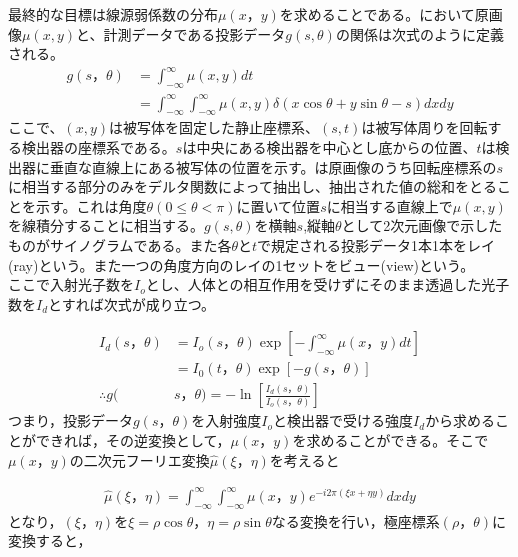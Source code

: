 最終的な目標は線源弱係数の分布$\mu(x，y)$を求めることである。において原画像$\mu(x,y)$と、計測データである投影データ$g(s,\theta)$の関係は次式のように定義される。
\begin{align}
g(s，\theta)&=\int^{\infty}_{-\infty}\mu(x,y)dt\\
&=\int^{\infty}_{-\infty}\int^{\infty}_{-\infty}\mu(x,y)\delta(x\cos{\theta}+y\sin{\theta}-s)dxdy\label{eq:radon}
\end{align}
ここで、$(x,y)$は被写体を固定した静止座標系、$(s,t)$は被写体周りを回転する検出器の座標系である。$s$は中央にある検出器を中心とし底からの位置、$t$は検出器に垂直な直線上にある被写体の位置を示す。は原画像のうち回転座標系の$s$に相当する部分のみをデルタ関数によって抽出し、抽出された値の総和をとることを示す。これは角度$\theta(0\leq\theta<\pi)$に置いて位置$s$に相当する直線上で$\mu(x,y)$を線積分することに相当する。$g(s,\theta)$を横軸$s$,縦軸$\theta$として2次元画像で示したものがサイノグラムである。また各$\theta$と$t$で規定される投影データ1本1本をレイ(ray)という。また一つの角度方向のレイの1セットをビュー(view)という。\\
ここで入射光子数を$I_o$とし、人体との相互作用を受けずにそのまま透過した光子数を$I_d$とすれば次式が成り立つ。

\begin{align}
I_d(s，\theta)&=I_o(s，\theta)\exp{\left[-\int^{\infty}_{-\infty}\mu(x，y)dt\right]}\\
&=I_0(t，\theta)\exp[-g(s，\theta)]\\
∴g(&s，\theta)=-\ln\left[\frac{I_d(s，\theta)}{I_o(s，\theta)}\right]\label{eq:touei}
\end{align}
つまり，投影データ$g(s，\theta)$を入射強度$I_o$と検出器で受ける強度$I_d$から求めることができれば，その逆変換として，$\mu(x，y)$を求めることができる。そこで$\mu(x，y)$の二次元フーリエ変換$\hat{\mu}(\xi，\eta)$を考えると

\begin{align}
\hat{\mu}(\xi，\eta)=\displaystyle\int^{\infty}_{-\infty}\int^{\infty}_{-\infty}\mu(x，y)e^{-i2\pi(\xi x+\eta y)}dxdy
\end{align}となり，$(\xi，\eta)$を$\xi=\rho\cos{\theta}，\eta=\rho\sin{\theta}$なる変換を行い，極座標系$(\rho，\theta)$に変換すると，

